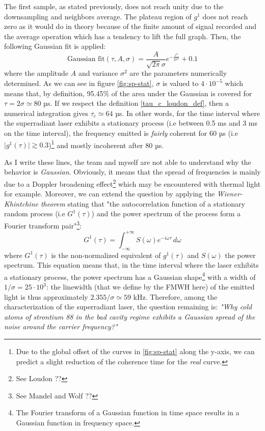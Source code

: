 \documentclass[11pt]{report}
\begin{document}
The first sample, as stated previously, does not reach unity due to the downsampling and neighbors average. The plateau region of $g^1$ does not reach zero as it would do in theory because of the finite amount of signal recorded and the average operation which has a tendency to lift the full graph. Then, the following Gaussian fit is applied:
\begin{equation}
\textrm{Gaussian fit}(\tau, A, \sigma) = \frac{A}{\sqrt{2\pi}\sigma} e^{-\frac{\tau^2}{2\sigma^2}} + 0.1
\end{equation}
where the amplitude $A$ and variance $\sigma^2$ are the parameters numerically determined. As we can see in figure \ref{fig:sp-stat}, $\sigma$ is valued to $4\cdot10^{-5}$ which means that, by definition, 95.45\% of the area under the Gaussian is covered for $\tau=2\sigma\simeq 80$ µs. If we respect the definition \ref{tau_c_loudon_def}, then a numerical integration gives $\tau_c \simeq 64$ µs. In other words, for the time interval where the superradiant laser exhibits a stationary process (i.e between 0.5 ms and 3 ms on the time interval), the frequency emitted is \textit{fairly} coherent for 60 µs (i.e $\vert g^1(\tau) \vert \gtrsim 0.3$)\footnote{Due to the global offset of the curves in \ref{fig:sp-stat} along the y-axis, we can predict a slight reduction of the coherence time for the \textit{real} curve.} and mostly incoherent after 80 µs.

As I write these lines, the team and myself are not able to understand why the behavior is \textit{Gaussian}. Obviously, it means that the spread of frequencies is mainly due to a Doppler broadening effect\footnote{See Loudon ??} which may be encountered with thermal light for example. Moreover, we can extend the question by applying the \textit{Wiener-Khintchine theorem} stating that "the autocorrelation function of a stationary random process (i.e $G^1(\tau)$) and the power spectrum of the process form a Fourier transform pair"\footnote{See Mandel and Wolf ??}:
\begin{equation}
G^1(\tau) = \int_{-\infty}^{+\infty} S(\omega) e^{-i\omega\tau} \,d\omega
\end{equation}
where $G^1(\tau)$ is the non-normalized equivalent of $g^1(\tau)$ and $S(\omega)$ the power spectrum. This equation means that, in the time interval where the laser exhibits a stationary process, the power spectrum has a Gaussian shape\footnote{The Fourier transform of a Gaussian function in time space results in a Gaussian function in frequency space.} with a width of $1/\sigma = 25\cdot 10^{3}$: the linewidth (that we define by the FMWH here) of the emitted light is thus approximately $2.355/\sigma \simeq 59$ kHz. Therefore, among the characterization of the superradiant laser, the question remaining is: \textit{"Why cold atoms of strontium 88 in the bad cavity regime exhibits a Gaussian spread of the noise around the carrier frequency?"}
\end{document}
